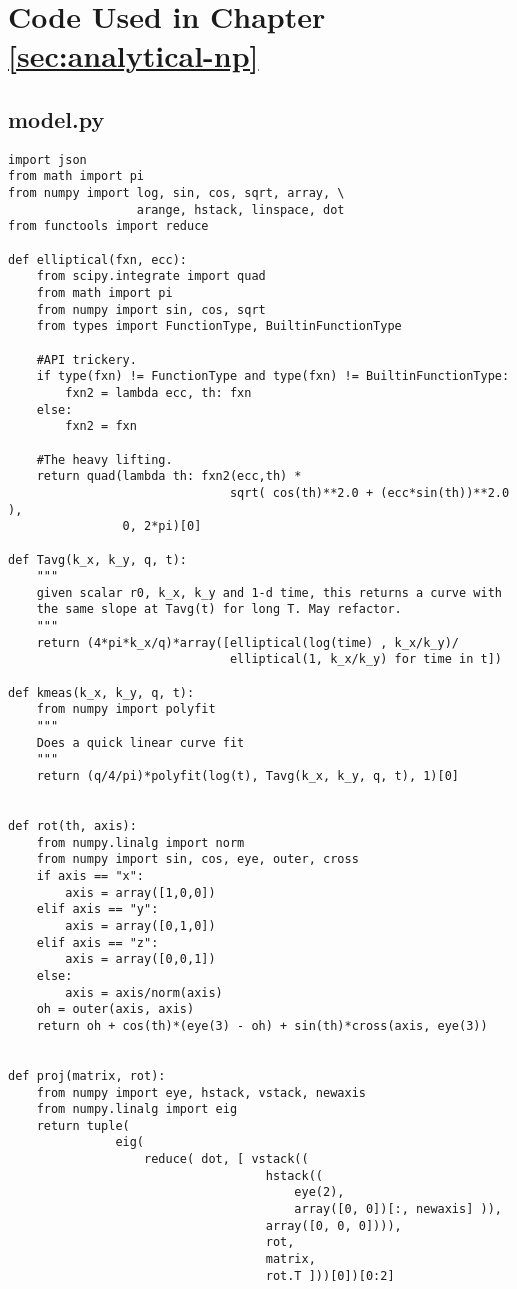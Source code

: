 \chapter{Code Used in Chapter \ref{sec:analytical-np}}
\label{apx:analytical-np}

\section{model.py}

\small
\begin{verbatim}
import json
from math import pi
from numpy import log, sin, cos, sqrt, array, \
                  arange, hstack, linspace, dot
from functools import reduce

def elliptical(fxn, ecc):
    from scipy.integrate import quad
    from math import pi
    from numpy import sin, cos, sqrt
    from types import FunctionType, BuiltinFunctionType

    #API trickery.
    if type(fxn) != FunctionType and type(fxn) != BuiltinFunctionType:
        fxn2 = lambda ecc, th: fxn
    else:
        fxn2 = fxn

    #The heavy lifting.
    return quad(lambda th: fxn2(ecc,th) *
                               sqrt( cos(th)**2.0 + (ecc*sin(th))**2.0 ),
                0, 2*pi)[0]

def Tavg(k_x, k_y, q, t):
    """
    given scalar r0, k_x, k_y and 1-d time, this returns a curve with
    the same slope at Tavg(t) for long T. May refactor.
    """
    return (4*pi*k_x/q)*array([elliptical(log(time) , k_x/k_y)/
                               elliptical(1, k_x/k_y) for time in t])

def kmeas(k_x, k_y, q, t):
    from numpy import polyfit
    """
    Does a quick linear curve fit 
    """
    return (q/4/pi)*polyfit(log(t), Tavg(k_x, k_y, q, t), 1)[0]


def rot(th, axis):
    from numpy.linalg import norm
    from numpy import sin, cos, eye, outer, cross
    if axis == "x":
        axis = array([1,0,0])
    elif axis == "y":
        axis = array([0,1,0])
    elif axis == "z":
        axis = array([0,0,1])
    else:
        axis = axis/norm(axis)
    oh = outer(axis, axis)
    return oh + cos(th)*(eye(3) - oh) + sin(th)*cross(axis, eye(3))
    

def proj(matrix, rot):
    from numpy import eye, hstack, vstack, newaxis
    from numpy.linalg import eig
    return tuple(
               eig(
                   reduce( dot, [ vstack((
                                    hstack((
                                        eye(2),
                                        array([0, 0])[:, newaxis] )),
                                    array([0, 0, 0]))),
                                    rot,
                                    matrix,
                                    rot.T ]))[0])[0:2]



\end{verbatim}
